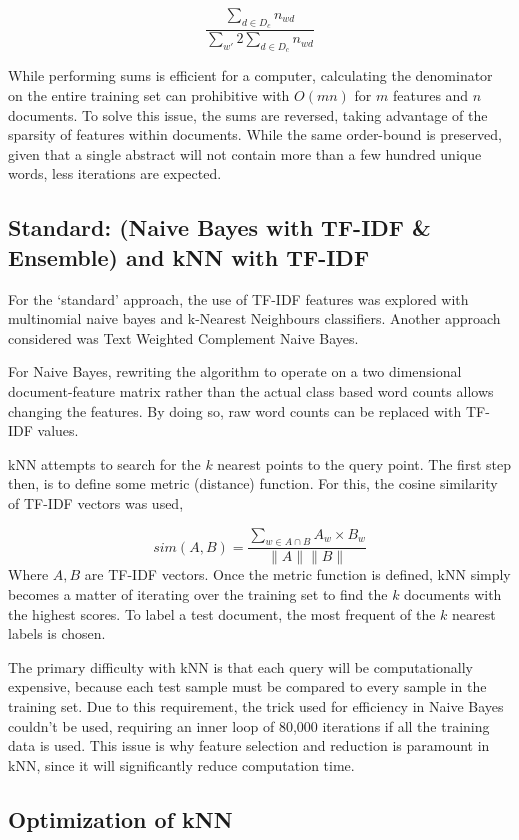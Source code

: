 \documentclass[10pt,twocolumn]{article}
\begin{document}
\[\frac {\sum_{d \in D_c} n_{wd}} {\sum_{w'} 2\sum_{d\in D_c} n_{wd}} \]

While performing sums is efficient for a computer, calculating the denominator on the entire training set can prohibitive with $O(mn)$ for $m$ features and $n$ documents. To solve this issue, the sums are reversed, taking advantage of the sparsity of features within documents. While the same order-bound is preserved, given that a single abstract will not contain more than a few hundred unique words, less iterations are expected.

\subsection*{Standard: (Naive Bayes with TF-IDF \& Ensemble) and kNN with TF-IDF}

For the `standard' approach, the use of TF-IDF features was explored with multinomial naive bayes and k-Nearest Neighbours classifiers. Another approach considered was Text Weighted Complement Naive Bayes.

For Naive Bayes, rewriting the algorithm to operate on a two dimensional document-feature matrix rather than the actual class based word counts allows changing the features. By doing so, raw word counts can be replaced with TF-IDF values. 

kNN attempts to search for the $k$ nearest points to the query point. The first step then, is to define some metric (distance) function. For this, the cosine similarity of TF-IDF vectors was used,

\[
sim(A,B) = \frac {\sum_{w \in A \cap B} A_w \times B_w} {\| A \| \| B \|}
\]
Where $A,B$ are TF-IDF vectors. Once the metric function is defined, kNN simply becomes a matter of iterating over the training set to find the $k$ documents with the highest scores. To label a test document, the most frequent of the $k$ nearest labels is chosen.

The primary difficulty with kNN is that each query will be computationally expensive, because each test sample must be compared to every sample in the training set. Due to this requirement, the trick used for efficiency in Naive Bayes couldn't be used, requiring an inner loop of 80,000 iterations if all the training data is used. This issue is why feature selection and reduction is paramount in kNN, since it will significantly reduce computation time.

\subsection*{Optimization of kNN}
\end{document}
